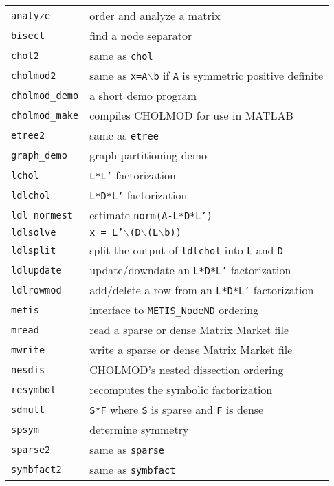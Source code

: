 \documentclass[11pt]{article}
\begin{document}
\vspace{0.1in}
\begin{tabular}{ll}
\hline
{\tt analyze}	    & order and analyze a matrix \\
{\tt bisect}	    & find a node separator \\
{\tt chol2}	    & same as {\tt chol} \\
{\tt cholmod2}	    & same as {\tt x=A}$\backslash${\tt b} if {\tt A} is symmetric positive definite \\
{\tt cholmod\_demo} & a short demo program \\
{\tt cholmod\_make} & compiles CHOLMOD for use in MATLAB \\
{\tt etree2}	    & same as {\tt etree} \\
{\tt graph\_demo}   & graph partitioning demo \\
{\tt lchol}	    & {\tt L*L'} factorization \\
{\tt ldlchol}	    & {\tt L*D*L'} factorization \\
{\tt ldl\_normest}  & estimate {\tt norm(A-L*D*L')} \\
{\tt ldlsolve}	    & {\tt x = L'}$\backslash${\tt (D}$\backslash${\tt (L}$\backslash${\tt b))} \\
{\tt ldlsplit}	    & split the output of {\tt ldlchol} into {\tt L} and {\tt D} \\
{\tt ldlupdate}	    & update/downdate an {\tt L*D*L'} factorization \\
{\tt ldlrowmod}	    & add/delete a row from an {\tt L*D*L'} factorization \\
{\tt metis}	    & interface to {\tt METIS\_NodeND} ordering \\
{\tt mread}	    & read a sparse or dense Matrix Market file \\
{\tt mwrite}	    & write a sparse or dense Matrix Market file \\
{\tt nesdis}	    & CHOLMOD's nested dissection ordering \\
{\tt resymbol}	    & recomputes the symbolic factorization \\
{\tt sdmult}	    & {\tt S*F} where {\tt S} is sparse and {\tt F} is dense \\
{\tt spsym}	    & determine symmetry \\
{\tt sparse2}	    & same as {\tt sparse} \\
{\tt symbfact2}	    & same as {\tt symbfact} \\
\hline
\end{tabular}
\end{document}

